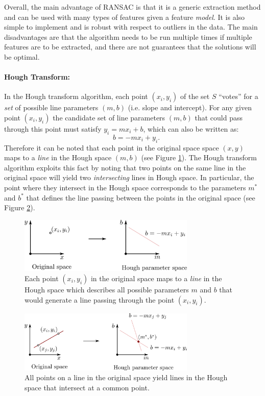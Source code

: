 Overall, the main advantage of RANSAC is that it is a generic extraction method and can be used with many types of features given a feature \textit{model}. It is also simple to implement and is robust with respect to outliers in the data. The main disadvantages are that the algorithm needs to be run multiple times if multiple features are to be extracted, and there are not guarantees that the solutions will be optimal.

\paragraph{Hough Transform:}
In the Hough transform algorithm, each point $(x_i,y_i)$ of the set $S$ ``votes'' for a \textit{set} of possible line parameters $(m,b)$ (i.e. slope and intercept). For any given point $(x_i,y_i)$ the candidate set of line parameters $(m,b)$ that could pass through this point must satisfy $y_i=mx_i+b$, which can also be written as:
\begin{equation*}
\quad b=-mx_i + y_i.
\end{equation*}
Therefore it can be noted that each point in the original space space $(x,y)$ maps to a \textit{line} in the Hough space $(m,b)$ (see Figure \ref{fig:hough1}). The Hough transform algorithm exploits this fact by noting that two points on the same line in the original space will yield two \textit{intersecting} lines in Hough space. In particular, the point where they intersect in the Hough space corresponds to the parameters $m^*$ and $b^*$ that defines the line passing between the points in the original space (see Figure \ref{fig:hough2}).
\begin{figure}[ht]
  \centering
  \includegraphics[width=0.75\textwidth]{tex/figs/ch11_figs/hough.png}
\caption{Each point $(x_i, y_i)$ in the original space maps to a \textit{line} in the Hough space which describes all possible parameters $m$ and $b$ that would generate a line passing through the point $(x_i, y_i)$.}
\label{fig:hough1}
\end{figure}
\begin{figure}[ht]
  \centering
  \includegraphics[width=0.75\textwidth]{tex/figs/ch11_figs/hough2.png}
\caption{All points on a line in the original space yield lines in the Hough space that intersect at a common point.}
\label{fig:hough2}
\end{figure}

